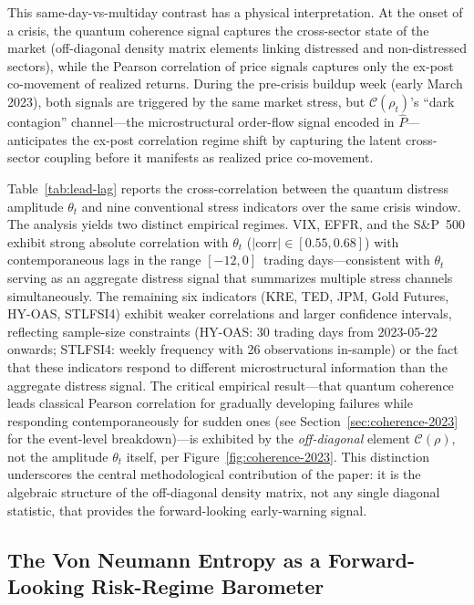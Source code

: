 This same-day-vs-multiday contrast has a physical interpretation. At the
onset of a crisis, the quantum coherence signal captures the cross-sector state
of the market (off-diagonal density matrix elements linking distressed and
non-distressed sectors), while the Pearson correlation of price signals captures
only the ex-post co-movement of realized returns. During the pre-crisis buildup
week (early March 2023), both signals are triggered by the same market stress,
but $\mathcal{C}(\rho_t)$'s ``dark contagion'' channel---the microstructural
order-flow signal encoded in $\hat{P}$---anticipates the ex-post correlation
regime shift by capturing the latent cross-sector coupling before it manifests
as realized price co-movement.



Table~\ref{tab:lead-lag} reports the cross-correlation between the quantum distress
amplitude $\theta_t$ and nine conventional stress indicators over the same
crisis window. The analysis yields two distinct empirical regimes. VIX, EFFR,
and the S\&P~500 exhibit strong absolute correlation with $\theta_t$
($|\text{corr}| \in [0.55, 0.68]$) with contemporaneous lags in the range
$[-12, 0]$~trading days---consistent with $\theta_t$ serving as an aggregate
distress signal that summarizes multiple stress channels simultaneously. The
remaining six indicators (KRE, TED, JPM, Gold Futures, HY-OAS, STLFSI4) exhibit
weaker correlations and larger confidence intervals, reflecting sample-size
constraints (HY-OAS: 30 trading days from 2023-05-22 onwards; STLFSI4: weekly
frequency with 26 observations in-sample) or the fact that these indicators
respond to different microstructural information than the aggregate distress
signal. The critical empirical result---that quantum coherence leads classical
Pearson correlation for gradually developing failures while responding
contemporaneously for sudden ones (see Section~\ref{sec:coherence-2023} for
the event-level breakdown)---is exhibited by
the \emph{off-diagonal} element $\mathcal{C}(\rho)$, not the amplitude $\theta_t$
itself, per Figure~\ref{fig:coherence-2023}. This distinction underscores the
central methodological contribution of the paper: it is the algebraic structure
of the off-diagonal density matrix, not any single diagonal statistic, that
provides the forward-looking early-warning signal.

\subsection{The Von Neumann Entropy as a Forward-Looking Risk-Regime Barometer}
\label{sec:entropy-2023}

